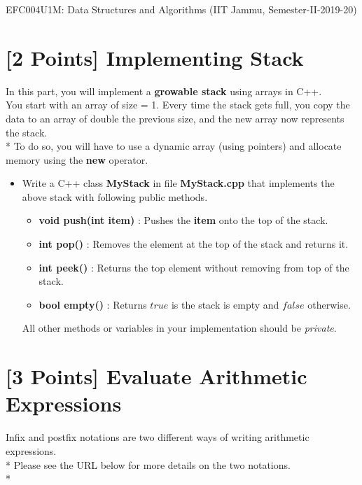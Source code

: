 \documentclass[14pt]{article}
\begin{document}
\large
EFC004U1M: Data Structures and Algorithms (IIT Jammu, Semester-II-2019-20)

\begin{myframe}[width=500pt,height=40pt,top=10pt,bottom=10pt,left=10pt,right=10pt,arc=10pt,auto outer arc]
\Large {}
\end{myframe}

\section{[2 Points] Implementing Stack}
In this part, you will implement a \textbf{growable stack} using arrays in C++. \\
You start with an array of size = 1. Every time the stack gets full, you copy the data to an array of double the previous size, and the new array now represents the stack. \\*
To do so, you will have to use a dynamic array (using pointers) and allocate memory using the \textbf{new} operator.

\begin{itemize}
    \item Write a C++ class \textbf{MyStack} in file \textbf{MyStack.cpp} that implements the above stack with following public methods.
    \begin{itemize}
        \item \textbf{void push(int item)} : Pushes the \textbf{item} onto the top of the stack.
        \item \textbf{int pop()} : Removes the element at the top of the stack and returns it.
        \item \textbf{int peek()} : Returns the top element without removing from top of the stack.
        \item \textbf{bool empty()} : Returns $true$ is the stack is empty and $false$ otherwise.
    \end{itemize}
    All other methods or variables in your implementation should be \textit{private}.
\end{itemize}

\section{[3 Points] Evaluate Arithmetic Expressions}

Infix and postfix notations are two different ways of writing arithmetic expressions. \\*
Please see the URL below for more details on the two notations. \\*
\end{document}
